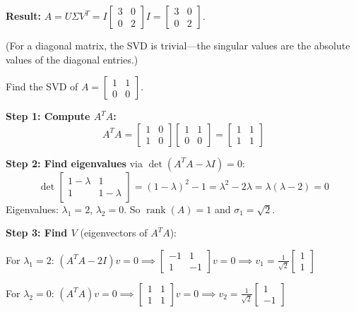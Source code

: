 \documentclass[11pt]{article}
\theoremstyle{definition}
\theoremstyle{plain}
\theoremstyle{remark}
\DeclareMathOperator{\rank}{rank}
\begin{document}
\begin{workedexample}[title=\textbf{Worked Example: SVD of a $2 \times 2$ matrix}]
\textbf{Result:} $A = U\Sigma V^T = I \begin{bmatrix}3&0\\0&2\end{bmatrix} I = \begin{bmatrix}3&0\\0&2\end{bmatrix}$. \checkmark

(For a diagonal matrix, the SVD is trivial---the singular values are the absolute values of the diagonal entries.)
\end{workedexample}

\begin{workedexample}[title=\textbf{Worked Example: SVD of a non-square matrix}]
Find the SVD of $A = \begin{bmatrix}1 & 1\\0 & 0\end{bmatrix}$.

\textbf{Step 1: Compute $A^T A$:}
\[
A^T A = \begin{bmatrix}1&0\\1&0\end{bmatrix}\begin{bmatrix}1&1\\0&0\end{bmatrix} = \begin{bmatrix}1&1\\1&1\end{bmatrix}
\]

\textbf{Step 2: Find eigenvalues} via $\det(A^TA - \lambda I) = 0$:
\[
\det\begin{bmatrix}1-\lambda & 1\\1 & 1-\lambda\end{bmatrix} = (1-\lambda)^2 - 1 = \lambda^2 - 2\lambda = \lambda(\lambda - 2) = 0
\]
Eigenvalues: $\lambda_1 = 2$, $\lambda_2 = 0$. So $\rank(A) = 1$ and $\sigma_1 = \sqrt{2}$.

\textbf{Step 3: Find $V$} (eigenvectors of $A^TA$):

For $\lambda_1 = 2$: $(A^TA - 2I)v = 0 \implies \begin{bmatrix}-1&1\\1&-1\end{bmatrix}v = 0 \implies v_1 = \frac{1}{\sqrt{2}}\begin{bmatrix}1\\1\end{bmatrix}$

For $\lambda_2 = 0$: $(A^TA)v = 0 \implies \begin{bmatrix}1&1\\1&1\end{bmatrix}v = 0 \implies v_2 = \frac{1}{\sqrt{2}}\begin{bmatrix}1\\-1\end{bmatrix}$


\end{workedexample}
\end{document}
